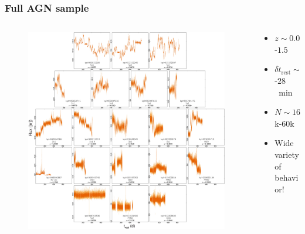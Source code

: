 \documentclass[hyperref={pdfpagelabels=false}]{beamer}
\begin{document}
\begin{frame}
\frametitle{Full AGN sample}
  \begin{columns}
    \centering
    \begin{column}{0.65\textwidth}
      \begin{figure}
        \includegraphics[scale=0.45]{images/AllLC.jpg}
      \end{figure}
    \end{column}
    \begin{column}{0.35\textwidth}
        \begin{itemize}
        \item $z \sim 0.02$-$1.5$
        \item $\delta t_{\mathrm{rest}} \sim 14$-$28$~min
        \item $N \sim 16$k-$60$k
        \item Wide variety of behavior!
        \end{itemize}
    \end{column}
  \end{columns}
\end{frame}
\end{document}
